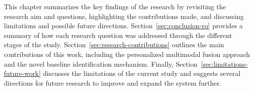This chapter summarizes the key findings of the research by revisiting the research aim and questions, highlighting the contributions made, and discussing limitations and possible future directions. Section~\ref{sec:conclusion-rq} provides a summary of how each research question was addressed through the different stages of the study. Section~\ref{sec:research-contributions} outlines the main contributions of this work, including the personalized multimodal fusion approach and the novel baseline identification mechanism. Finally, Section~\ref{sec:limitations-future-work} discusses the limitations of the current study and suggests several directions for future research to improve and expand the system further.



